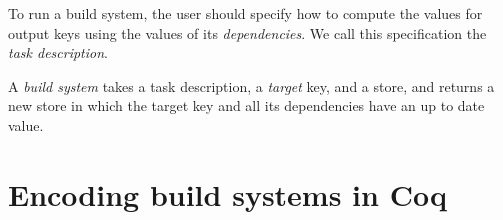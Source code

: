 \documentclass[sigplan,review]{acmart}\settopmatter{printfolios=true,printccs=false,printacmref=false}
\begin{document}
To run a build system, the user should specify how to compute the values for
output keys using the values of its \emph{dependencies}. We call this
specification the \emph{task description}.

A \emph{build system} takes a task description, a \emph{target} key, and a
store, and returns a new store in which the target key and all its dependencies
have an up to date value.


\vspace{-3mm}
\section{Encoding build systems in Coq}\label{sec-abstractions}
\end{document}
